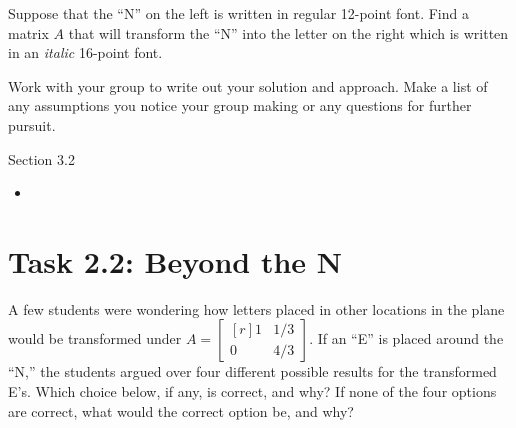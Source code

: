 \documentclass{problemset}
\newcommand{\mat}[1]{\begin{bmatrix*}[r]#1\end{bmatrix*}}
\begin{document}
Suppose that the ``N'' on the left is written in regular 12-point font.  Find a matrix $A$ that will transform
	the ``N'' into the letter on the right which is written in an \emph{italic} 16-point font.

Work with your group to write out your solution and approach.  Make a list of any assumptions you
notice your group making or any questions for further pursuit.
\newpage


\begin{lesson}
	\newpage

	Section 3.2

	\begin{itemize}
		\item 
	\end{itemize}


	\newpage
\end{lesson}
\section*{Task 2.2: Beyond the N}

	A few students were wondering how letters placed in other
locations in the plane would be transformed under $A= \mat{ 1&  1/3  \\ 0 & 4/3}$. 
	If an ``E'' is placed around the
	``N,'' the students argued over four different possible results for the
	transformed E's. Which choice below, if any, is correct, and why? If none of
	the four options are correct, what would the correct option be, and why?
\end{document}
